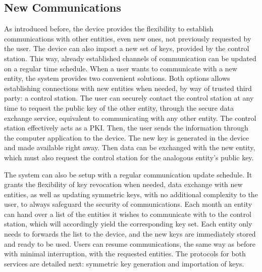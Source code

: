 


\subsection{New Communications}\label{chap:arch:services:new-comms}

As introduced before, the device provides the flexibility to establish communications with other entities, even new ones, not previously requested by the user.
The device can also import a new set of keys, provided by the control station.
This way, already established channels of communication can be updated on a regular time schedule.
When a user wants to communicate with a new entity, the system provides two convenient solutions.
Both options allows establishing connections with new entities when needed, by way of trusted third party: a control station. 
The user can securely contact the control station at any time to request the public key of the other entity, through the secure data exchange service, equivalent to communicating with any other entity. The control station effectively acts as a \ac{PKI}.
Then, the user sends the information through the computer application to the device. The new key is generated in the device and made available right away. Then data can be exchanged with the new entity, which must also request the control station for the analogous entity's public key.

The system can also be setup with a regular communication update schedule. It grants the flexibility of key revocation when needed, data exchange with new entities, as well as updating symmetric keys, with no additional complexity to the user, to always safeguard the security of communications.
Each month an entity can hand over a list of the entities it wishes to communicate with to the control station, which will accordingly yield the corresponding key set.
Each entity only needs to forwards the list to the device, and the new keys are immediately stored and ready to be used.
Users can resume communications, the same way as before with minimal interruption, with the requested entities.
The protocols for both services are detailed next: symmetric key generation and importation of keys.

